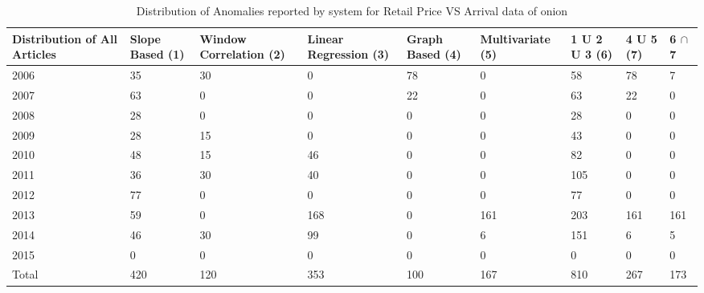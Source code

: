 \documentclass[a4paper,10pt]{report}
\begin{document}
	  
	  
	
	\begin{table}[]
	\centering
	\resizebox{\textwidth}{!}
	{\begin{tabular}{|l|l|l|l|l|l|l|l|l|}
	\hline
	Distribution of All Articles & Slope Based (1) & Window Correlation (2) & Linear Regression (3) & Graph Based (4) & Multivariate (5) & 1 U 2 U 3 (6) & 4 U 5 (7) & 6  $\cap$ 7 \\
	\hline
	2006                         & 35          & 30          & 0                 & 78          & 0             & 58        & 78    & 7                                     \\
	\hline
	2007                         & 63          & 0           & 0                 & 22          & 0             & 63        & 22    & 0                                     \\
	\hline
	2008                         & 28          & 0           & 0                 & 0           & 0             & 28        & 0     & 0                                     \\
	\hline
	2009                         & 28          & 15          & 0                 & 0           & 0             & 43        & 0     & 0                                     \\
	\hline
	2010                         & 48          & 15          & 46                & 0           & 0             & 82        & 0     & 0                                     \\
	\hline
	2011                         & 36          & 30          & 40                & 0           & 0             & 105       & 0     & 0                                     \\
	\hline
	2012                         & 77          & 0           & 0                 & 0           & 0             & 77        & 0     & 0                                     \\
	\hline
	2013                         & 59          & 0           & 168               & 0           & 161           & 203       & 161   & 161                                   \\
	\hline
	2014                         & 46          & 30          & 99                & 0           & 6             & 151       & 6     & 5                                     \\
	\hline
	2015                         & 0           & 0           & 0                 & 0           & 0             & 0         & 0     & 0                                     \\
	\hline
	Total			    & 420         & 120         & 353               & 100         & 167           & 810       & 267   & 173                                   \\
	\hline
	\end{tabular}}
	\caption{Distribution of Anomalies reported by system for Retail Price VS Arrival data of onion }
	\label{RetailVsArrivalDist}
	\end{table}
	
\end{document}
